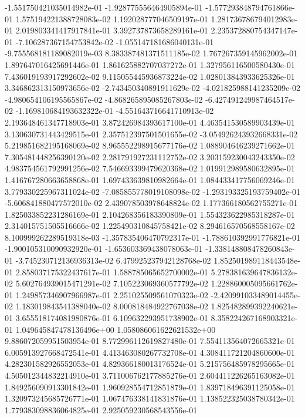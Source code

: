 -1.551750421035014982e-01
-1.928775556464905894e-01
-1.577293848794761866e-01
1.575194221388728083e-02
1.192028777046509197e-01
1.281736786794012983e-01
2.019803341417917841e-01
3.392737873658289161e-01
2.235372880754347147e-01
-7.106287367154753842e-02
-1.055147181686040131e-01
-9.755568181189082019e-03
8.383387481371511185e-02
1.767267359145962002e-01
1.897647016425691446e-01
1.861625882707037272e-01
1.327956116500580430e-01
7.436019193917292602e-02
9.115055445936873224e-02
1.028013843933625326e-01
3.346862313150973656e-02
-2.743450340891911629e-02
-4.021825988141235209e-02
-4.980654106195565867e-02
-4.868265895085267803e-02
-6.427491249987464517e-02
-1.169810684193632322e-01
-4.551643716641710913e-02
2.193648461347718903e-01
3.872426984393617100e-01
4.463541530589903439e-01
3.130630731443429515e-01
2.357512397501501655e-02
-3.054926243932668331e-02
5.219851682195168069e-02
8.965552298915677176e-02
1.088904646239271662e-01
7.305481448256390120e-02
2.281791927231112752e-02
3.203159230043243350e-02
4.983754561792991256e-02
7.546693399479620368e-02
1.019912989580632895e-01
1.416767280663658868e-01
1.697433639810982664e-01
1.084433417756069246e-01
3.779330225967311024e-02
-7.085855778019108098e-02
-1.293193325193759402e-01
-5.606841880477572010e-02
2.439078503978648824e-02
1.177366180562755271e-01
1.825033852231286169e-01
2.104268356183390809e-01
1.554323622985318287e-01
2.314015751505516666e-02
1.225490310845758421e-02
8.294616570568558167e-02
8.100999262289519318e-03
-1.357835406470792317e-01
-1.788610392991776821e-01
-1.900105310090932920e-01
-1.653603369438078063e-01
-1.338148808478260843e-01
-3.745230712136936313e-02
6.479925237942128768e-02
1.852501989118443548e-01
2.858037175322437617e-01
1.588785065652700002e-01
5.278381639647836132e-02
5.602764939015471291e-02
7.105223069360577792e-02
1.228860005095661762e-01
1.249857346907966987e-01
2.251025509561070323e-02
-2.420991033489014455e-02
1.183019843541388040e-02
8.000818484922767038e-02
1.825482899392240621e-01
3.655518174081980876e-01
6.109632293951738902e-01
8.358224267168903321e-01
1.049645847478136496e+00
1.058086061622621532e+00
9.886072059951503954e-01
8.772996112619827480e-01
7.554113564072665321e-01
6.005913927668472541e-01
4.413463080267732708e-01
4.308411721204860600e-01
4.282301582926552053e-01
4.829366180013176524e-01
5.215756485978295665e-01
4.505012344832214910e-01
3.711006762177885276e-01
2.604411226265163082e-01
1.849256090913301842e-01
1.960928554712851879e-01
1.839718496391125058e-01
1.320973245685726771e-01
1.067476338141831876e-01
1.138522325038780342e-01
1.779383098836064825e-01
2.925059230568543556e-01
